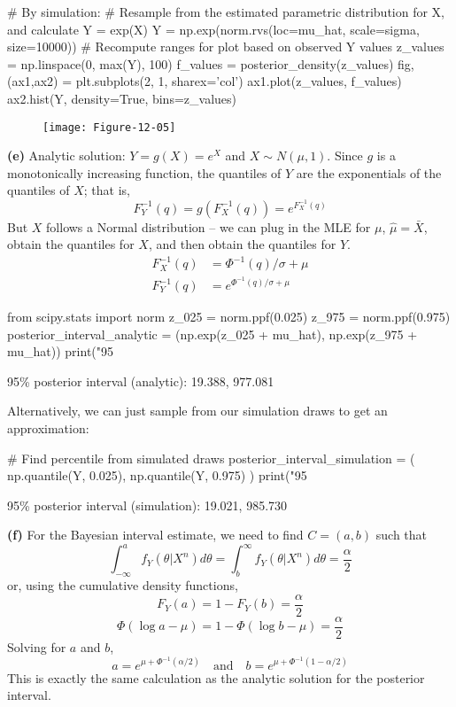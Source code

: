 \begin{python}
# By simulation:
# Resample from the estimated parametric distribution for X, and calculate Y = exp(X)
Y = np.exp(norm.rvs(loc=mu_hat, scale=sigma, size=10000))
# Recompute ranges for plot based on observed Y values
z_values = np.linspace(0, max(Y), 100)
f_values = posterior_density(z_values)
fig, (ax1,ax2) = plt.subplots(2, 1, sharex='col')
ax1.plot(z_values, f_values)
ax2.hist(Y, density=True, bins=z_values)
\end{python}

\begin{figure}[H]
\centering
\texttt{[image: Figure-12-05]}
\end{figure}

\textbf{(e)}
Analytic solution: \(Y = g(X) = e^X\) and \(X \sim N(\mu, 1)\). Since
\(g\) is a monotonically increasing function, the quantiles of \(Y\) are
the exponentials of the quantiles of \(X\); that is,
\[
F_Y^{-1}(q) = g(F_X^{-1}(q)) = e^{F_X^{-1}(q)}
\]
But \(X\) follows a Normal distribution -- we can plug in the MLE for
\(\mu\), \(\hat{\mu} = \bar{X}\), obtain the quantiles for \(X\),
and then obtain the quantiles for \(Y\).
\begin{align*}
F_X^{-1}(q) &= \Phi^{-1}(q) / \sigma + \mu \\
F_Y^{-1}(q) &= e^{\Phi^{-1}(q) / \sigma + \mu}
\end{align*}

\begin{python}
from scipy.stats import norm
z_025 = norm.ppf(0.025)
z_975 = norm.ppf(0.975)
posterior_interval_analytic = (np.exp(z_025 + mu_hat), np.exp(z_975 + mu_hat))
print("95%
\end{python}
\begin{console}
95\% posterior interval (analytic):  19.388, 977.081
\end{console}
Alternatively, we can just sample from our simulation draws to get an
approximation:

\begin{python}
# Find percentile from simulated draws
posterior_interval_simulation = (
    np.quantile(Y, 0.025),
    np.quantile(Y, 0.975)
)
print("95%
\end{python}
\begin{console}
95\% posterior interval (simulation):  19.021, 985.730
\end{console}
\textbf{(f)}
For the Bayesian interval estimate, we need to find \(C = (a, b)\) such
that
\[
\int_{-\infty}^{a} f_Y(\theta | X^{n}) d\theta = \int_b^{\infty} f_Y(\theta | X^{n}) d\theta = \frac{\alpha}{2}
\]
or, using the cumulative density functions,
\[
F_Y(a) = 1 - F_Y(b) = \frac{\alpha}{2}
\]
\[
\Phi(\log a - \mu) = 1 - \Phi(\log b - \mu) = \frac{\alpha}{2}
\]
Solving for \(a\) and \(b\),
\[
a = e^{\mu + \Phi^{-1}(\alpha / 2)}
\quad \text{and} \quad
b = e^{\mu + \Phi^{-1}(1 - \alpha / 2)}
\]
This is exactly the same calculation as the analytic solution for the
posterior interval.

